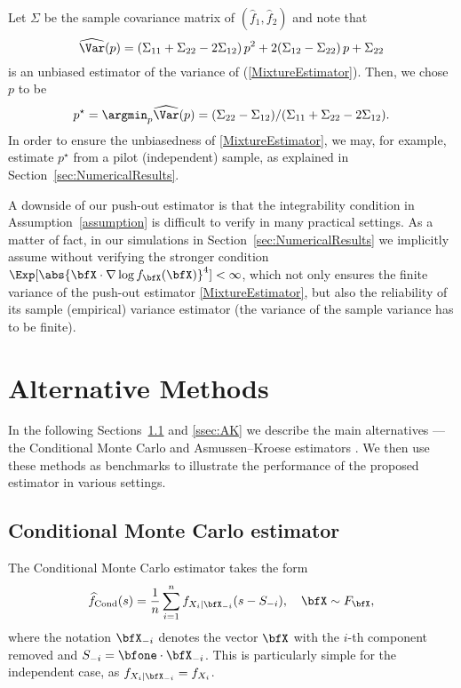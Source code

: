 Let $\Sigma$ be the sample covariance matrix of $(\widehat{f}_1,\widehat{f}_2)$ and note that
\[
\widehat{\Var}(p)= (\Sigma_{11} + \Sigma_{22} - 2 \Sigma_{12}) \, p^2 + 2(\Sigma_{12} - \Sigma_{22})\, p + \Sigma_{22}
\]
is an unbiased estimator of the variance of (\ref{MixtureEstimator}). Then, we chose $p$ to be
\begin{equation} \label{MixtureCoefficient}
p^\star = \argmin_p \widehat{\Var}(p) = (\Sigma_{22} - \Sigma_{12})/(\Sigma_{11} + \Sigma_{22} - 2 \Sigma_{12}).
\end{equation}
In order to ensure the unbiasedness of \eqref{MixtureEstimator}, we may, for example, estimate  $p^\star$ from a pilot (independent) sample, as explained in Section~\ref{sec:NumericalResults}.

A downside of our push-out estimator is that the integrability condition in Assumption~\ref{assumption} is difficult to verify in many practical settings. As a matter of fact, in our simulations in Section~\ref{sec:NumericalResults} we implicitly assume without verifying the stronger condition  $\Exp[ \abs{ \bfX \cdot \nabla \log f_{\bfX}(\bfX) }^4] <\infty$, which not only ensures the finite variance of the push-out estimator \eqref{MixtureEstimator}, but also the reliability of its sample (empirical) variance estimator (the variance of the sample variance has to be finite).

\section{Alternative Methods}
In the following Sections~\ref{ssec:CondMC} and \ref{ssec:AK} we describe the main alternatives --- the Conditional Monte Carlo and Asmussen--Kroese estimators \cite{asmussen2017conditional}. We then use these methods as benchmarks to illustrate the performance of the proposed estimator in various settings.

\subsection{Conditional Monte Carlo estimator} \label{ssec:CondMC}

The Conditional Monte Carlo estimator \cite{asmussen2017conditional} takes the form
\[ \widehat{f}_{\mathrm{Cond}}(s) = \frac1n \sum_{i=1}^n f_{X_i | \bfX_{-i}}( s - S_{-i} ) , \quad \bfX \sim F_{\bfX},
 \]
where the notation $\bfX_{-i}$ denotes the vector $\bfX$ with the $i$-th component removed and $S_{-i}=\bfone \cdot \bfX_{-i}$. This is particularly simple for the independent case, as $f_{X_i | \bfX_{-i}} = f_{X_i}$.

